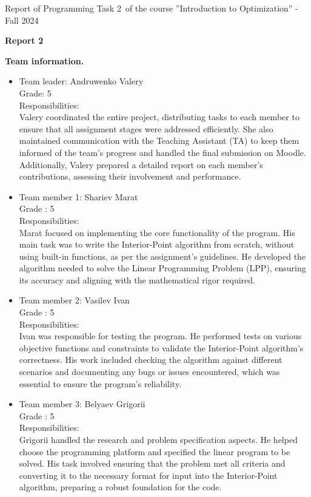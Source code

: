\documentclass[12pt, legalpaper]{exam}
\newcommand{\course}{Introduction to Optimization}
\newcommand{\term}{Fall 2024}
\newcommand{\examnum}{Report of Programming Task 2}
\begin{document}
\noindent \examnum \, of the  course ''\course'' - \term


\noindent
{}




\vspace{12pt}
\begin{center}
    \textbf{Report 2}
\end{center}

\vspace{12pt}

\noindent  \textbf{Team information.}

\begin{itemize}
    \item Team leader: Andruwenko Valery 
    \\Grade: 5
    \\ Responsibilities:
    \\Valery coordinated the entire project, distributing tasks to each member to ensure that all assignment stages were addressed efficiently. She also maintained communication with the Teaching Assistant (TA) to keep them informed of the team’s progress and handled the final submission on Moodle. Additionally, Valery prepared a detailed report on each member's contributions, assessing their involvement and performance.
    \item Team member 1: Shariev Marat 
    \\Grade : 5
    \\ Responsibilities:
    \\Marat focused on implementing the core functionality of the program. His main task was to write the Interior-Point algorithm from scratch, without using built-in functions, as per the assignment’s guidelines. He developed the algorithm needed to solve the Linear Programming Problem (LPP), ensuring its accuracy and aligning with the mathematical rigor required.
    \item Team member 2: Vasilev Ivan
    \\ Grade : 5
    \\Responsibilities:
    \\Ivan was responsible for testing the program. He performed tests on various objective functions and constraints to validate the Interior-Point algorithm’s correctness. His work included checking the algorithm against different scenarios and documenting any bugs or issues encountered, which was essential to ensure the program’s reliability.
    \item Team member 3: Belyaev Grigorii
    \\ Grade : 5
    \\Responsibilities:
    \\Grigorii handled the research and problem specification aspects. He helped choose the programming platform and specified the linear program to be solved. His task involved ensuring that the problem met all criteria and converting it to the necessary format for input into the Interior-Point algorithm, preparing a robust foundation for the code.
\end{itemize}
\end{document}
